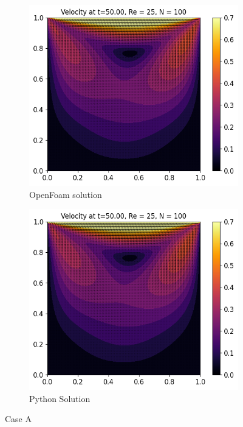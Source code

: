 \documentclass[10pt]{report}
\begin{document}
\begin{figure}[H]
    \centering
    \begin{subfigure}[b]{0.475\textwidth}
        \centering
        \includegraphics[width=\textwidth]{plots/velocity_RE25_OF.png}
        \caption{OpenFoam solution}
        \label{caseAof}
    \end{subfigure}
    \hfill
    \begin{subfigure}[b]{0.475\textwidth}
        \centering
        \includegraphics[width=\textwidth]{plots/velocity_RE25.png}
        \caption{Python Solution}
        \label{caseApy}
    \end{subfigure}
    \caption{Case A}
    \label{caseA}
\end{figure}
\end{document}
